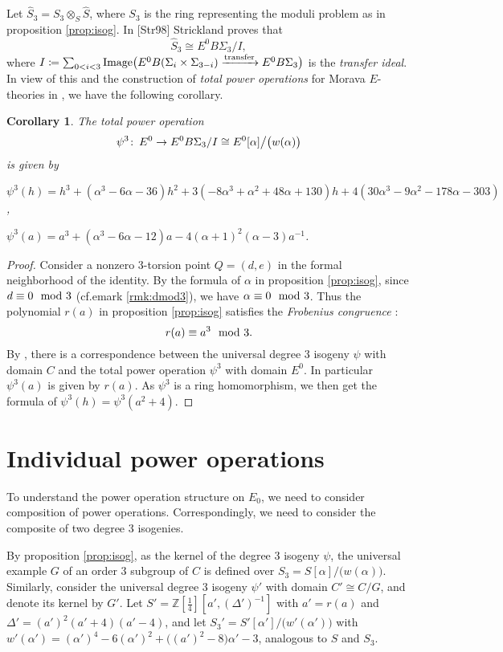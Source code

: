 \documentclass{gtpart}
\newtheorem{cor}[thm]{Corollary}
\theoremstyle{definition}
\theoremstyle{remark}
\def\co{\colon\thinspace}
\newcommand{\mb}[1]{\mathbb{#1}}
\newcommand{\BZ}{{\mb Z}}
\newcommand{\HS}{\widehat{S}}
\newcommand{\md}{~~{\rm mod}~}
\newcommand{\A}{\alpha}
\newcommand{\p}{\psi^3}
\begin{document}
Let $\HS_3 = S_3 \otimes_S \HS$, where $S_3$ is the ring representing the moduli problem as in proposition \ref{prop:isog}.  In [Str98] Strickland proves that 
\[
 \HS_3 \cong E^0 B\Sigma_3 / I, 
\]
where $I \coloneqq \sum_{0<i<3} {\rm Image} \big( E^0 B(\Sigma_i \times \Sigma_{3-i}) \xrightarrow{\rm transfer} E^0 B\Sigma_3 \big)$ is the {\em transfer ideal}.  
In view of this and the construction of {\em total power operations} for Morava $E$-theories in \cite[3.23]{cong}, we have the following corollary.  

\begin{cor}
\label{cor:psi3}
 The total power operation 
 \[
  \p \co E^0 \to E^0 B\Sigma_3 / I \cong E^0 [\A] \big/ \big( w(\A) \big) 
 \]
 is given by 
 
 $\p(h) = h^3 + (\A^3 - 6 \A - 36) h^2 + 3 (-8 \A^3 + \A^2 + 48 \A + 130) h + 4 (30 \A^3 - 9 \A^2 - 178 \A - 303)$, 
 
 $\p(a) = a^3 + (\A^3 - 6 \A - 12) a - 4 (\A + 1)^2 (\A - 3) a^{-1}$.  
 
\end{cor}
\begin{proof}
 Consider a nonzero 3-torsion point $Q = (d,e)$ in the formal neighborhood of the identity.  
 By the formula of $\A$ in proposition \ref{prop:isog}, since $d \equiv 0 \md 3$ (cf.emark \ref{rmk:dmod3}), we have $\A \equiv 0 \md 3$.  
 Thus the polynomial $r(a)$ in proposition \ref{prop:isog} satisfies the {\em Frobenius congruence} \cite[11.18 and 11.20]{cong}: 
 \[
  r(a) \equiv a^3 \md 3.  
 \]
 By \cite[theorem B]{cong}, there is a correspondence between the universal degree 3 isogeny $\psi$ with domain $C$ 
 and the total power operation $\p$ with domain $E^0$.  In particular $\p(a)$ is given by $r(a)$.  
 As $\p$ is a ring homomorphism, we then get the formula of $\p(h) = \p(a^2 + 4)$.  
\end{proof}


\section{Individual power operations}
\label{sec:Gamma}

To understand the power operation structure on $E_0$, 
we need to consider composition of power operations.  
Correspondingly, we need to consider the composite of two degree 3 isogenies.  

By proposition \ref{prop:isog}, as the kernel of the degree 3 isogeny $\psi$, 
the universal example $G$ of an order 3 subgroup of $C$ is defined over 
$S_3 = S[\A] \big/ \big( w(\A) \big)$.  
Similarly, consider the universal degree 3 isogeny $\psi'$ with domain 
$C' \cong C/G$, and denote its kernel by $G'$.  
Let $S' = \BZ [\frac{1}{4}] [a', (\Delta')^{-1}]$ with $a' = r(a)$ and $\Delta' = (a')^2 (a' + 4) (a' - 4)$, 
and let $S_3' = S'[\A'] \big/ \big( w'(\A') \big)$ with $w'(\A') = (\A')^4 - 6 (\A')^2 + \big( (a')^2 - 8 \big) \A' - 3$, analogous to $S$ and $S_3$.  
\end{document}
